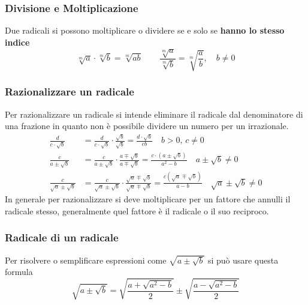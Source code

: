 \subsubsection{Divisione e Moltiplicazione}
Due radicali si possono moltiplicare o dividere se e solo se \textbf{hanno lo stesso indice}
\begin{equation*}
  \sqrt[m]{a}\cdot\sqrt[m]{b} = \sqrt[m]{ab}\qquad\frac{\sqrt[m]{a}}{\sqrt[m]{b}} = \sqrt[m]{\frac{a}{b}}
  ,\quad b \neq 0
\end{equation*}

\subsubsection{Razionalizzare un radicale}
Per razionalizzare un radicale si intende eliminare il radicale dal denominatore di una frazione in
quanto non è possibile dividere un numero per un irrazionale.
\begin{align*}
  \frac{d}{c\cdot\sqrt{b}} & = \frac{d}{c\cdot\sqrt{b}}\cdot\frac{\sqrt{b}}{\sqrt{b}} = 
  \frac{d\cdot\sqrt{b}}{cb} \quad b > 0,\, c \neq 0 \\
  \frac{c}{a\pm\sqrt{b}} &= \frac{c}{a\pm\sqrt{b}}\cdot\frac{a\mp\sqrt{b}}{a\mp\sqrt{b}} = 
  \frac{c\cdot(a\pm\sqrt{b})}{a^2-b} \quad a\pm\sqrt{b} \neq 0 \\
  \frac{c}{\sqrt{a}\pm\sqrt{b}} &=
  \frac{c}{\sqrt{a}\pm\sqrt{b}}\cdot\frac{\sqrt{a}\mp\sqrt{b}}{\sqrt{a}\mp\sqrt{b}} =
  \frac{c(\sqrt{a}\mp\sqrt{b})}{a-b} \quad \sqrt{a}\pm\sqrt{b} \neq 0
\end{align*}
In generale per razionalizzare si deve moltiplicare per un fattore che annulli il radicale stesso, 
generalmente quel fattore è il radicale o il suo reciproco.

\subsubsection{Radicale di un radicale}
Per risolvere o semplificare espressioni come $\sqrt{a\pm\sqrt{b}}$ si può usare questa formula
\begin{equation*}
  \sqrt{a\pm\sqrt{b}} = \sqrt{\frac{a+\sqrt{a^2-b}}{2}}\pm\sqrt{\frac{a-\sqrt{a^2-b}}{2}}
\end{equation*}

